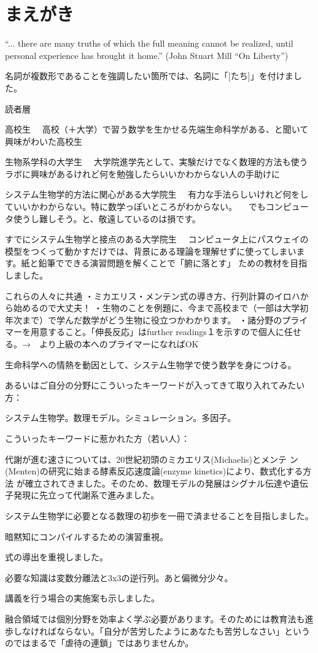 \chapter{まえがき}
``... there are many truths of which the full meaning cannot be realized, until personal experience has brought it home.'' (John Stuart Mill ``On Liberty'')

名詞が複数形であることを強調したい箇所では、名詞に「[たち]」を付けました。

読者層

高校生
　高校（＋大学）で習う数学を生かせる先端生命科学がある、と聞いて興味がわいた高校生

生物系学科の大学生
　大学院進学先として、実験だけでなく数理的方法も使うラボに興味があるけれど何を勉強したらいいかわからない人の手助けに

システム生物学的方法に関心がある大学院生
　有力な手法らしいけれど何をしていいかわからない。特に数学っぽいところがわからない。
　でもコンピュータ使うし難しそう。と、敬遠しているのは損です。　

すでにシステム生物学と接点のある大学院生
　コンピュータ上にパスウェイの模型をつくって動かすだけでは、背景にある理論を理解せずに使ってしまいます。紙と鉛筆でできる演習問題を解くことで「腑に落とす」 ための教材を目指しました。

これらの人々に共通
・ミカエリス・メンテン式の導き方、行列計算のイロハから始めるので大丈夫！
・生物のことを例題に、今まで高校まで（一部は大学初年次まで）で学んだ数学がどう生物に役立つかわかります。
・諸分野のプライマーを用意すること。「伸長反応」はfurther readings１を示すので個人に任せる。→　より上級の本へのプライマーになればOK

生命科学への情熱を動因として、システム生物学で使う数学を身につける。


あるいはご自分の分野にこういったキーワードが入ってきて取り入れてみたい方：



システム生物学。数理モデル。シミュレーション。多因子。

こういったキーワードに惹かれた方（若い人）：

代謝が進む速さについては、20世紀初頭のミカエリス(Michaelis)とメンテ
ン(Menten)の研究に始まる酵素反応速度論(enzyme kinetics)により、数式化する方法
が確立されてきました。そのため、数理モデルの発展はシグナル伝達や遺伝子発現に先立って代謝系で進みました。



システム生物学に必要となる数理の初歩を一冊で済ませることを目指しました。



暗黙知にコンパイルするための演習重視。

式の導出を重視しました。

必要な知識は変数分離法と3x3の逆行列。あと偏微分少々。

講義を行う場合の実施案も示しました。

融合領域では個別分野を効率よく学ぶ必要があります。そのためには教育法も進歩しなければならない。「自分が苦労したようにあなたも苦労しなさい」というのではまるで「虐待の連鎖」ではありませんか。


